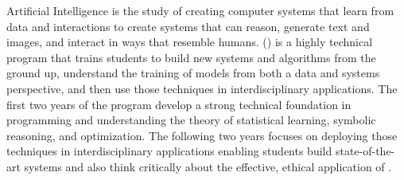 Artificial Intelligence is the study of creating computer systems that
learn from data and interactions to create systems that can reason,
generate text and images, and interact in ways that resemble humans.
%
\name{} (\short{}) is a highly technical program that trains
students to build new \ai{} systems and algorithms from the ground up, understand the
training of models from both a data and systems perspective, and then
use those techniques in interdisciplinary applications.
%
The first two years of the program develop a strong technical
foundation in programming and understanding the theory of statistical
learning, symbolic reasoning, and optimization.
%
The following two years focuses on deploying those techniques in
interdisciplinary applications enabling students build state-of-the-art \ai{} systems and also think critically
about the effective, ethical application of \ai{}.